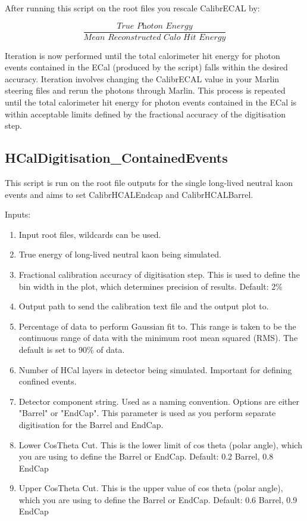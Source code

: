 \documentclass[11pt, oneside]{article}   	%
\begin{document}
After running this script on the root files you rescale CalibrECAL by:

\begin{equation}
\frac{\textit{True Photon Energy}}{\textit{Mean Reconstructed Calo Hit Energy}}
\end{equation}

Iteration is now performed until the total calorimeter hit energy for photon events contained in the ECal (produced by the script) falls within the desired accuracy.  Iteration involves changing the CalibrECAL value in your Marlin steering files and rerun the photons through Marlin.  This process is repeated until the total calorimeter hit energy for photon events contained in the ECal is within acceptable limits defined by the fractional accuracy of the digitisation step.

\subsection{HCalDigitisation\_ContainedEvents}

This script is run on the root file outputs for the single long-lived neutral kaon events and aims to set CalibrHCALEndcap and CalibrHCALBarrel.

Inputs:
\begin{enumerate}
\item Input root files, wildcards can be used.
\item True energy of long-lived neutral kaon being simulated.
\item Fractional calibration accuracy of digitisation step.  This is used to define the bin width in the plot, which determines precision of results.  Default: 2\%
\item Output path to send the calibration text file and the output plot to.
\item Percentage of data to perform Gaussian fit to.  This range is taken to be the continuous range of data with the minimum root mean squared (RMS).  The default is set to 90\% of data.
\item Number of HCal layers in detector being simulated.  Important for defining confined events.
\item Detector component string.  Used as a naming convention.  Options are either "Barrel" or "EndCap".  This parameter is used as you perform separate digitisation for the Barrel and EndCap.
\item Lower CosTheta Cut.  This is the lower limit of cos theta (polar angle), which you are using to define the Barrel or EndCap.  Default: 0.2 Barrel, 0.8 EndCap
\item Upper CosTheta Cut.  This is the upper value of cos theta (polar angle), which you are using to define the Barrel or EndCap.  Default: 0.6 Barrel, 0.9 EndCap
\end{enumerate}
\end{document}

